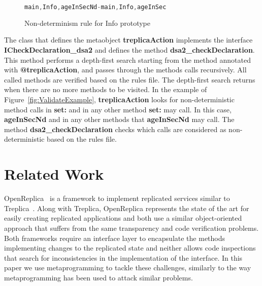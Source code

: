 \documentclass[preprint,review]{elsarticle}
\newcommand{\srcstyle}[1]{\ttfamily\textbf{#1}\rmfamily}
\begin{document}
\begin{figure}[htbp]
\centering
\begin{lstlisting}[language=Java]
main,Info,ageInSecNd-main,Info,ageInSec
\end{lstlisting}
\caption{Non-determinism rule for Info prototype}
\label{fig:ValidateRuleExample2}
\end{figure}

The  class  that   defines  the  metaobject  \srcstyle{treplicaAction}
implements   the   interface  \srcstyle{ICheckDeclaration\_dsa2}   and
defines  the  method \srcstyle{dsa2\_checkDeclaration}.   This  method
performs a depth-first search starting  from the method annotated with
\srcstyle{@treplicaAction},  and  passes  through  the  methods  calls
recursively.   All called  methods  are verified  based  on the  rules
file. The depth-first search returns when there are no more methods to
be  visited.   In  the  example  of  Figure~\ref{fig:ValidateExample},
\srcstyle{treplicaAction} looks for  non-deterministic method calls in
\srcstyle{set:} and in  any other method \srcstyle{set:}  may call. In
this  case,  \srcstyle{ageInSecNd}  and  in  any  other  methods  that
\srcstyle{ageInSecNd}        may        call.        The        method
\srcstyle{dsa2\_checkDeclaration} checks which calls are considered as
non-deterministic based on the rules file.



\section{Related Work}
\label{related}

OpenReplica~\cite{altinbuken2012commodifying}   is   a  framework   to
implement  replicated services  similar to  Treplica~\cite{vieira08a}.
Along with
Treplica,  OpenReplica represents  the  state of  the  art for  easily
creating   replicated   applications   and    both   use   a   similar
object-oriented approach  that suffers from the  same transparency and
code verification problems. Both frameworks require an interface layer
to  encapsulate the  methods  implementing changes  to the  replicated
state   and  neither   allows   code  inspections   that  search   for
inconsistencies in the implementation of the interface.  In this paper
we use metaprogramming  to tackle these challenges,  similarly to the
way metaprogramming has been used to attack similar problems.
\end{document}

